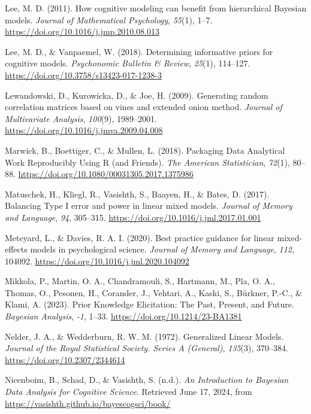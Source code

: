 \documentclass[
  doc,12pt,floatsintext]{apa7}
\newlength{\cslhangindent}
\newenvironment{CSLReferences}[2] %
 {\begin{list}{}{%
  \setlength{\itemindent}{0pt}
  \setlength{\leftmargin}{0pt}
  \setlength{\parsep}{0pt}
  \ifodd #1
   \setlength{\leftmargin}{\cslhangindent}
   \setlength{\itemindent}{-1\cslhangindent}
  \fi
  \setlength{\itemsep}{#2\baselineskip}}}
 {\end{list}}
\begin{document}
\begin{CSLReferences}{1}{0}
Lee, M. D. (2011). How cognitive modeling can benefit from hierarchical {Bayesian} models. \emph{Journal of Mathematical Psychology}, \emph{55}(1), 1--7. \url{https://doi.org/10.1016/j.jmp.2010.08.013}

Lee, M. D., \& Vanpaemel, W. (2018). Determining informative priors for cognitive models. \emph{Psychonomic Bulletin \& Review}, \emph{25}(1), 114--127. \url{https://doi.org/10.3758/s13423-017-1238-3}

Lewandowski, D., Kurowicka, D., \& Joe, H. (2009). Generating random correlation matrices based on vines and extended onion method. \emph{Journal of Multivariate Analysis}, \emph{100}(9), 1989--2001. \url{https://doi.org/10.1016/j.jmva.2009.04.008}

Marwick, B., Boettiger, C., \& Mullen, L. (2018). Packaging {Data Analytical Work Reproducibly Using R} (and {Friends}). \emph{The American Statistician}, \emph{72}(1), 80--88. \url{https://doi.org/10.1080/00031305.2017.1375986}

Matuschek, H., Kliegl, R., Vasishth, S., Baayen, H., \& Bates, D. (2017). Balancing {Type I} error and power in linear mixed models. \emph{Journal of Memory and Language}, \emph{94}, 305--315. \url{https://doi.org/10.1016/j.jml.2017.01.001}

Meteyard, L., \& Davies, R. A. I. (2020). Best practice guidance for linear mixed-effects models in psychological science. \emph{Journal of Memory and Language}, \emph{112}, 104092. \url{https://doi.org/10.1016/j.jml.2020.104092}

Mikkola, P., Martin, O. A., Chandramouli, S., Hartmann, M., Pla, O. A., Thomas, O., Pesonen, H., Corander, J., Vehtari, A., Kaski, S., Bürkner, P.-C., \& Klami, A. (2023). Prior {Knowledge Elicitation}: {The Past}, {Present}, and {Future}. \emph{Bayesian Analysis}, \emph{-1}, 1--33. \url{https://doi.org/10.1214/23-BA1381}

Nelder, J. A., \& Wedderburn, R. W. M. (1972). Generalized {Linear Models}. \emph{Journal of the Royal Statistical Society. Series A (General)}, \emph{135}(3), 370--384. \url{https://doi.org/10.2307/2344614}

Nicenboim, B., Schad, D., \& Vasishth, S. (n.d.). \emph{An {Introduction} to {Bayesian Data Analysis} for {Cognitive Science}}. Retrieved June 17, 2024, from \url{https://vasishth.github.io/bayescogsci/book/}


\end{CSLReferences}
\end{document}
